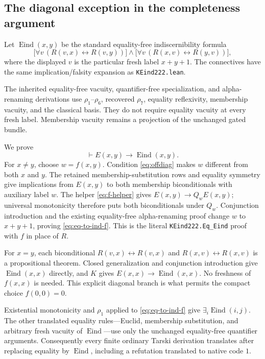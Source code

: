 \subsection{The diagonal exception in the completeness argument}

Let $\operatorname{Eind}(x,y)$ be the standard equality-free
indiscernibility formula
\[
 \bigl[\forall v\,(R(v,x)\leftrightarrow R(v,y))\bigr]
 \wedge
 \bigl[\forall v\,(R(x,v)\leftrightarrow R(y,v))\bigr],
\]
where the displayed $v$ is the particular fresh label $x+y+1$.
The connectives have the same implication/falsity expansion as
\texttt{KEind222.lean}.

The inherited equality-free vacuity, quantifier-free specialization,
and alpha-renaming derivations use $\rho_1$--$\rho_6$, recovered
$\rho_7$, equality reflexivity, membership vacuity, and the classical
basis. They do not require equality vacuity at every fresh label.
Membership vacuity remains a projection of the unchanged gated bundle.

We prove
\begin{equation}
 \vdash E(x,y)\to\operatorname{Eind}(x,y).
 \label{eq:eq-to-ind-f}
\end{equation}
For $x\ne y$, choose $w=f(x,y)$. Condition \eqref{eq:offdiag} makes
$w$ different from both $x$ and $y$. The retained membership-substitution
rows and equality symmetry give implications from $E(x,y)$ to both
membership biconditionals with auxiliary label $w$. The helper
\eqref{eq:f-helper} gives $E(x,y)\to Q_wE(x,y)$; universal monotonicity
therefore puts both biconditionals under $Q_w$. Conjunction introduction
and the existing equality-free alpha-renaming proof change $w$ to
$x+y+1$, proving \eqref{eq:eq-to-ind-f}. This is the literal
\texttt{KEind222.Eq\_Eind} proof with $f$ in place of $R$.

For $x=y$, each biconditional $R(v,x)\leftrightarrow R(v,x)$ and
$R(x,v)\leftrightarrow R(x,v)$ is a propositional theorem. Closed
generalization and conjunction introduction give
$\operatorname{Eind}(x,x)$ directly, and $K$ gives
$E(x,x)\to\operatorname{Eind}(x,x)$. No freshness of $f(x,x)$ is
needed. This explicit diagonal branch is what permits the compact
choice $f(0,0)=0$.

Existential monotonicity and $\rho_1$ applied to
\eqref{eq:eq-to-ind-f} give $\exists_i\operatorname{Eind}(i,j)$.
The other translated equality rules---Euclid, membership substitution,
and arbitrary fresh vacuity of $\operatorname{Eind}$---use only the
unchanged equality-free quantifier arguments. Consequently every finite
ordinary Tarski derivation translates after replacing equality by
$\operatorname{Eind}$, including a refutation translated to native code
$1$.

